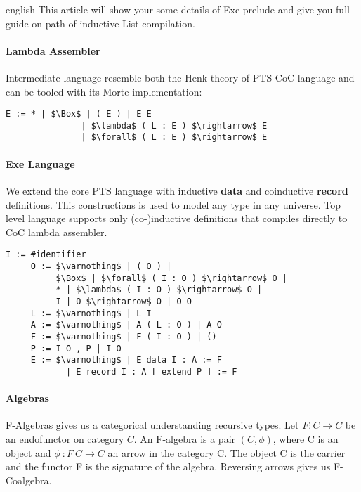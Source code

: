 \documentclass{abstract}
\begin{document}
\begin{theses}{english}
This article will show your some details of Exe prelude and give you full guide on path of inductive List compilation.

\paragraph{Lambda Assembler}

Intermediate language resemble both the Henk\cite{Henk} theory of PTS CoC language
and can be tooled with its Morte\cite{morte} implementation:

\begin{lstlisting}[mathescape=true]
    E := * | $\Box$ | ( E ) | E E 
               | $\lambda$ ( L : E ) $\rightarrow$ E 
               | $\forall$ ( L : E ) $\rightarrow$ E
\end{lstlisting}

\paragraph{Exe Language}

We extend the core PTS language with inductive {\bf data} and coinductive {\bf record} definitions.
This constructions is used to model any type in any universe. Top level language supports
only (co-)inductive definitions that compiles directly to CoC lambda assembler.

\vspace{0.5cm}
\begin{lstlisting}[mathescape=true]
     I := #identifier
     O := $\varnothing$ | ( O ) |
          $\Box$ | $\forall$ ( I : O ) $\rightarrow$ O |
          * | $\lambda$ ( I : O ) $\rightarrow$ O |
          I | O $\rightarrow$ O | O O
     L := $\varnothing$ | L I
     A := $\varnothing$ | A ( L : O ) | A O
     F := $\varnothing$ | F ( I : O ) | ()
     P := I O , P | I O
     E := $\varnothing$ | E data I : A := F
            | E record I : A [ extend P ] := F
\end{lstlisting}

   \paragraph{Algebras}

   F-Algebras gives us a categorical understanding recursive types.
   Let $F : C \rightarrow C$ be an endofunctor on category $C$.
   An F-algebra is a pair $(C, \phi)$, where C is an object and $\phi\ : F\ C \rightarrow C$
   an arrow in the category C. The object C is the carrier and the functor
   F is the signature of the algebra. Reversing arrows gives us F-Coalgebra.


\end{theses}
\end{document}
